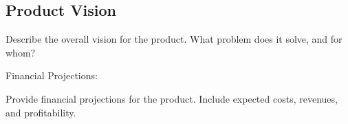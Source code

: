 
\subsection{Product Vision}

Describe the overall vision for the product.
What problem does it solve, and for whom?

Financial Projections:

    Provide financial projections for the product.
    Include expected costs, revenues, and profitability.
